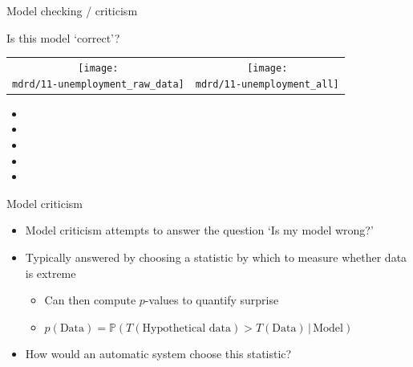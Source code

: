 \begin{frame}{Model checking / criticism}
  
\end{frame}

\begin{frame}{Is this model `correct'?}
\newcommand{\wmgd}{0.5\columnwidth}
\newcommand{\hmgd}{3.0cm}
\newcommand{\mdrd}{figures/11-unemployment}
\newcommand{\mbm}{\hspace{-0.3cm}}
\begin{tabular}{cc}
\mbm \texttt{[image: \\mdrd/11-unemployment\_raw\_data]} & \texttt{[image: \\mdrd/11-unemployment\_all]}
\end{tabular}

{\footnotesize
\begin{itemize}

  \item  

  \item  

  \item  

  \item  

  \item  

\end{itemize}
}
\end{frame}

\begin{frame}{Model criticism}
  \begin{itemize}
    \item Model criticism attempts to answer the question `Is my model wrong?'
    \vspace{\baselineskip}
    \item Typically answered by choosing a statistic by which to measure whether data is extreme
    \begin{itemize}
      \item Can then compute $p$-values to quantify surprise
      \item $p(\textrm{Data}) = \mathbb{P}(T(\textrm{Hypothetical data}) > T(\textrm{Data}) \,|\, \textrm{Model})$
    \end{itemize}
    \vspace{\baselineskip}
    \item How would an automatic system choose this statistic?
  \end{itemize}
\end{frame}

